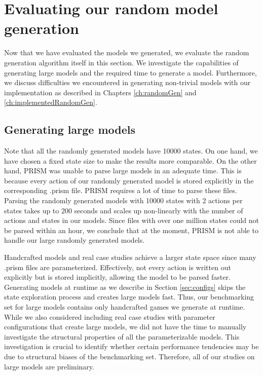 \section{Evaluating our random model generation}
Now that we have evaluated the models we generated, we evaluate the random generation algorithm itself in this section.
We investigate the capabilities of generating large models and the required time to generate a model. Furthermore, we discuss difficulties 
we encountered in generating non-trivial models with our implementation as described in Chapters \ref{ch:randomGen} and \ref{ch:implementedRandomGen}.

\subsection{Generating large models} \label{subsec:largeModels}
Note that all the randomly generated models have 10000 states. On one hand, we have chosen a fixed state size to make the results more comparable.
On the other hand, PRISM was unable to parse large models in an adequate time.
This is because every action of our randomly generated model is stored explicitly in the corresponding .prism file.
PRISM requires a lot of time to parse these files. Parsing the randomly generated models with 10000 states with 2 actions per states takes
up to 200 seconds and scales up non-linearly with the number of actions and states in our models.
Since files with over one million states could not be parsed within an hour, we conclude that at the moment, PRISM is not able to handle our large randomly generated models.

Handcrafted models and real case studies achieve a larger state space since many .prism files are parameterized.
Effectively, not every action is written out explicitly but is stored implicitly, allowing the model to be parsed faster.
Generating models at runtime as we describe in Section \ref{sec:configs} skips the state exploration process and 
creates large models fast. 
Thus, our benchmarking set for large models contains only handcrafted games we generate at runtime. 
While we also considered including real case studies with parameter configurations that create large models, 
we did not have the time to manually investigate the structural properties of all the parameterizable models.
This investigation is crucial to identify whether certain performance tendencies may be due to structural biases of the benchmarking set.
Therefore, all of our studies on large models are preliminary.

